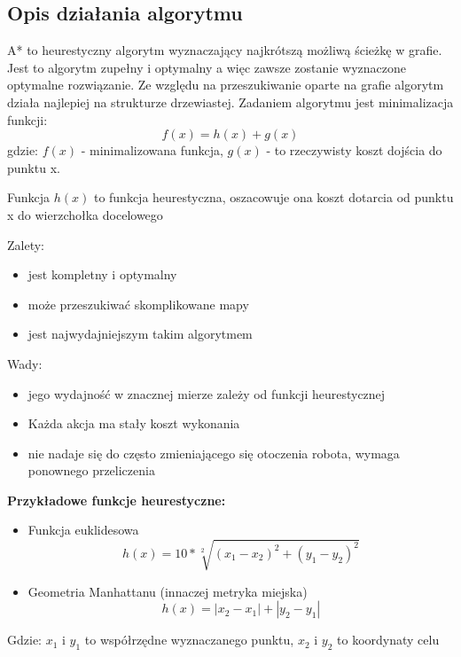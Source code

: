 \subsection{Opis działania algorytmu}

A* to heurestyczny algorytm wyznaczający najkrótszą możliwą ścieżkę w grafie. 
Jest to algorytm zupełny i optymalny a więc zawsze zostanie wyznaczone optymalne 
rozwiązanie. Ze względu na przeszukiwanie oparte na grafie algorytm działa najlepiej na strukturze drzewiastej.
Zadaniem algorytmu jest minimalizacja funkcji:
\begin{equation}
	f(x)=h(x) + g(x)
	\label{Eq:funkcjaKosztuAStar}
\end{equation}
gdzie: $f(x)$ - minimalizowana funkcja, $g(x)$ - to rzeczywisty koszt dojścia do punktu x.

Funkcja $h(x)$ to funkcja heurestyczna, oszacowuje ona koszt dotarcia od punktu x do wierzchołka docelowego

Zalety:
\begin{itemize}
	\item jest kompletny i optymalny
	\item może przeszukiwać skomplikowane mapy
	\item jest najwydajniejszym takim algorytmem
\end{itemize}
Wady:
\begin{itemize}
	\item jego wydajność w znacznej mierze zależy od funkcji heurestycznej
	\item Każda akcja ma stały koszt wykonania
	\item nie nadaje się do często zmieniającego się otoczenia robota, wymaga ponownego przeliczenia
\end{itemize}


\textbf{Przykładowe funkcje heurestyczne:}
\begin{itemize}
	\item Funkcja euklidesowa
	      \begin{equation}
	      	h(x)= 10 * \sqrt[2]{(x_1 - x_2)^2 + (y_1 - y_2)^2}
	      	\label{Eq:heuresticEucalides}
	      \end{equation}
	\item Geometria Manhattanu (innaczej metryka miejska)
	      \begin{equation}
	      	h(x)= |x_2 - x_1| + |y_2 - y_1|
	      	\label{Eq:heuresticManhattanu}
	      \end{equation}
\end{itemize}
Gdzie: $x_1$ i $y_1$ to współrzędne wyznaczanego punktu, $x_2$ i $y_2$ to koordynaty celu


